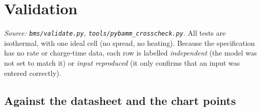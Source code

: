 \documentclass[11pt,a4paper]{article}
\begin{document}
\section{Validation}\label{sec:val}
\emph{Source: \texttt{bms/validate.py}, \texttt{tools/pybamm\_crosscheck.py}.} All tests are isothermal, with one ideal cell (no spread, no heating). Because the specification has no rate or charge-time data, each row is labelled \emph{independent} (the model was not set to match it) or \emph{input reproduced} (it only confirms that an input was entered correctly).

\subsection{Against the datasheet and the chart points}
\end{document}
